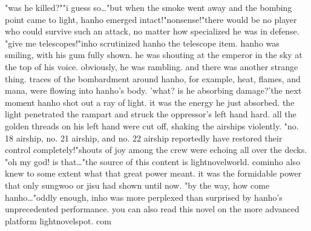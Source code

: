 "was he killed?""i guess so…"but when the smoke went away and the bombing point came to light, hanho emerged intact!"nonsense!"there would be no player who could survive such an attack, no matter how specialized he was in defense.
"give me telescopes!"inho scrutinized hanho the telescope item.
 hanho was smiling, with his gum fully shown.
 he was shouting at the emperor in the sky at the top of his voice.
 obviously, he was rambling.
and there was another strange thing.
 traces of the bombardment around hanho, for example, heat, flames, and mana, were flowing into hanho's body.
'what? is he absorbing damage?'the next moment hanho shot out a ray of light.
 it was the energy he just absorbed.
 the light penetrated the rampart and struck the oppressor's left hand hard.
 all the golden threads on his left hand were cut off, shaking the airships violently.
"no.
 18 airship, no.
 21 airship, and no.
 22 airship reportedly have restored their control completely!"shouts of joy among the crew were echoing all over the decks.
 "oh my god! is that…"the source of this content is lightnovelworld.
c‌ominho also knew to some extent what that great power meant.
 it was the formidable power that only sungwoo or jisu had shown until now.
"by the way, how come hanho…"oddly enough, inho was more perplexed than surprised by hanho's unprecedented performance.
 you can also read this novel on the more advanced platform lightnovelspot.
com

 